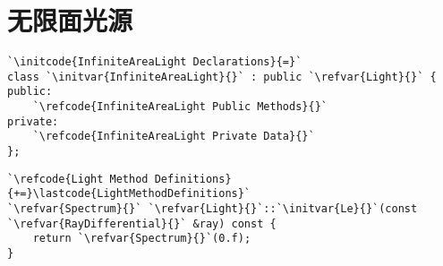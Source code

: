\section{无限面光源}\label{sec:无限面光源}

\begin{lstlisting}
`\initcode{InfiniteAreaLight Declarations}{=}`
class `\initvar{InfiniteAreaLight}{}` : public `\refvar{Light}{}` {
public:
    `\refcode{InfiniteAreaLight Public Methods}{}`
private:
    `\refcode{InfiniteAreaLight Private Data}{}`
};
\end{lstlisting}
\begin{lstlisting}
`\refcode{Light Method Definitions}{+=}\lastcode{LightMethodDefinitions}`
`\refvar{Spectrum}{}` `\refvar{Light}{}`::`\initvar{Le}{}`(const `\refvar{RayDifferential}{}` &ray) const {
    return `\refvar{Spectrum}{}`(0.f);
}
\end{lstlisting}